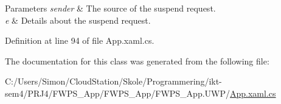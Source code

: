 \begin{DoxyParams}{Parameters}
{\em sender} & The source of the suspend request.\\
\hline
{\em e} & Details about the suspend request.\\
\hline
\end{DoxyParams}


Definition at line 94 of file App.\+xaml.\+cs.



The documentation for this class was generated from the following file\+:\begin{DoxyCompactItemize}
\item 
C\+:/\+Users/\+Simon/\+Cloud\+Station/\+Skole/\+Programmering/ikt-\/sem4/\+P\+R\+J4/\+F\+W\+P\+S\+\_\+\+App/\+F\+W\+P\+S\+\_\+\+App/\+F\+W\+P\+S\+\_\+\+App.\+U\+W\+P/\mbox{\hyperlink{_u_w_p_2_app_8xaml_8cs}{App.\+xaml.\+cs}}\end{DoxyCompactItemize}
